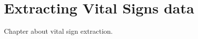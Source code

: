 \chapter{Extracting Vital Signs data}
\label{chp:measuring_vital_signs}

Chapter about vital sign extraction.
